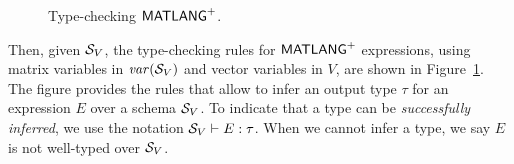 \begin{figure}
  \caption{Type-checking $\mathsf{MATLANG}^{\sf +}$.}
  \label{fig:matlangplus-type-rules}
\end{figure}



Then, given $\mathcal{S}_V$, the type-checking rules for $\mathsf{MATLANG}^{\sf +}$ expressions, using matrix variables in $\operatorname{\mathit{var}}(\mathcal{S}_V)$ and vector variables in $V$,
are shown in Figure~\ref{fig:matlangplus-type-rules}.  The figure provides the rules
that allow to infer an output type $\tau$ for an expression $E$
over a schema $\mathcal{S}_V$. 
 To indicate that a type can be
\emph{successfully inferred}, we use the notation
$\mathcal{S}_V\vdash E:\tau$.  When we cannot infer a type, we say $E$
is not well-typed over $\mathcal{S}_V$.  


%

